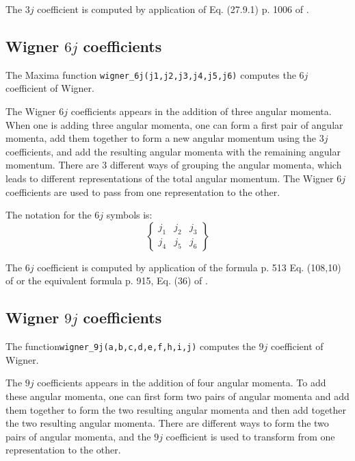 \documentclass[11pt]{article}
\begin{document}
The $3j$ coefficient is computed by application of  
Eq. (27.9.1) p. 1006 of \cite{abramowitz_math_functions}.  


\subsection{Wigner $6j$ coefficients}

The Maxima function \texttt{wigner\_6j(j1,j2,j3,j4,j5,j6)} computes the $6j$ 
coefficient of Wigner.

The Wigner $6j$ coefficients appears in the addition of three angular momenta. 
When one is adding three angular momenta, one can form a first 
pair of angular momenta, add them together to form a new angular momentum
using the $3j$ coefficients, and add the resulting angular momenta with the
remaining angular momentum\cite{landau_mecaq,messiah_field_chapter}.
There are 3 different ways of grouping the angular momenta, which leads to 
different representations of the total angular momentum. 
The Wigner $6j$ coefficients are used to pass from one representation to the 
other. 

The notation for the $6j$ symbols is:
\begin{equation}
  \left\{\begin{array}{ccc}j_1 & j_2 & j_3 \\ j_4 & j_5 & j_6\end{array} \right\} 
\end{equation}

The $6j$ coefficient is computed by application of the formula  p. 513 Eq. (108,10) of \cite{landau_mecaq} or the equivalent formula  p. 915, Eq. (36) of \cite{messiah_field_chapter}. 


\subsection{Wigner $9j$ coefficients}

The function\texttt{wigner\_9j(a,b,c,d,e,f,h,i,j)} computes 
the $9j$ coefficient of Wigner. 

The $9j$ coefficients appears in the addition of four angular momenta. 
To add these angular momenta, one can first form two pairs of angular 
momenta and add them together to form the two resulting angular momenta 
and then add together the two resulting angular momenta. 
There are different ways to form the two pairs of angular momenta, and 
the $9j$ coefficient is used to transform from one representation to
the other\cite{landau_mecaq,messiah_field_chapter}. 
\end{document}
